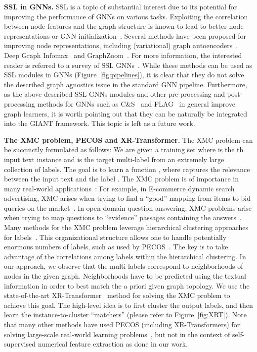 \documentclass{article} \usepackage{iclr2022_conference,times}
\begin{document}
\textbf{SSL in GNNs.} 
SSL is a topic of substantial interest due to its potential for improving the performance of GNNs on various tasks. Exploiting the correlation between node features and the graph structure is known to lead to better node representations or GNN initialization~\citep{Hu*2020Strategies,you2018graphrnn,you2020graph,hu2020gpt}. Several methods have been proposed for improving node representations, including (variational) graph autoencoders~\citep{kipf2016variational}, Deep Graph Infomax~\citep{velickovic2019deep} and GraphZoom~\citep{deng2020graphzoom}. For more information, the interested reader is referred to a survey of SSL GNNs~\citep{xie2021self}. While these methods can be used as SSL modules in GNNs (Figure~\ref{fig:pipelines}), it is clear that they do not solve the described graph agnostics issue in the standard GNN pipeline. Furthermore, as the above described SSL GNNs modules and other pre-processing and post-processing methods for GNNs such as C\&S~\citep{huang2021combining} and FLAG~\citep{kong2020flag} in general improve graph learners, it is worth pointing out that they can be naturally be integrated into the GIANT framework. This topic is left as a future work.  

\textbf{The XMC problem, PECOS and XR-Transformer.} 
The XMC problem can be succinctly formulated as follows: We are given a training set  where  is the th input text instance and  is the target multi-label from an extremely large collection of labels. The goal is to learn a function , where  captures the relevance between the input text  and the label . The XMC problem is of importance in many real-world applications~\citep{jiang2021lightxml,ye2020pretrained}: For example, in E-commerce dynamic search advertising, XMC arises when trying to find a ``good'' mapping from items to bid queries on the market~\citep{prabhu2018parabel,prabhu2014fastxml}. In open-domain question answering, XMC problems arise when trying to map questions to ``evidence'' passages containing the answers~\citep{chang2020pretraining,lee2019latent}. Many methods for the XMC problem leverage hierarchical clustering approaches for labels~\citep{prabhu2018parabel,you2019attentionxml}. This organizational structure allows one to handle potentially enormous numbers of labels, such as used by PECOS~\citep{yu2020pecos}. The key is to take advantage of the correlations among labels within the hierarchical clustering. 
In our approach, we observe that the multi-labels correspond to neighborhoods of nodes in the given graph. Neighborhoods have to be predicted using the textual information in order to best match the a priori given graph topology. We use the state-of-the-art XR-Transformer~\citep{jiong2021fast} method for solving the XMC problem to achieve this goal. The high-level idea is to first cluster the output labels, and then learn the instance-to-cluster ``matchers'' (please refer to Figure~\ref{fig:XRT}). Note that many other methods have used PECOS (including XR-Transformers) for solving large-scale real-world learning problems~\citep{etter2021accelerating,liu2021label,chang2020taming,baharav2021enabling,chang2021extreme,yadav2021session,sen2021top}, but not in the context of self-supervised numerical feature extraction as done in our work. 
\end{document}
